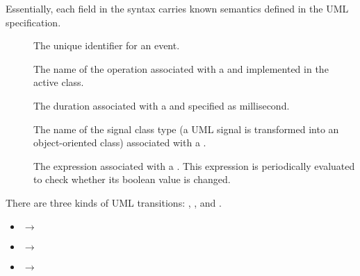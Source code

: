 Essentially, each field in the syntax carries known semantics defined in the UML specification.
\begin{description}
	\item[] The unique identifier for an event.
	
	\item[] The name of the operation associated with a  and implemented in the active class. 
	
	\item[] The duration associated with a  and specified as millisecond.
	
	\item[] The name of the signal class type (a UML signal is transformed into an object-oriented class) associated with a .
	
	\item[] The expression associated with a . This expression is periodically evaluated to check whether its boolean value is changed.
\end{description}




\vskip 0.2cm
\noindent
{}
There are three kinds of UML transitions: , , and .

\begin{itemize}[\footnotesize]
	\item {} $\rightarrow$  
	
	\item {}$\rightarrow$
	
	\item {} $\rightarrow$ 
\end{itemize}


